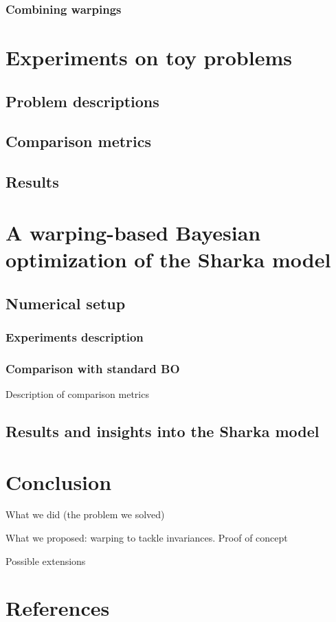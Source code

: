 \subsubsection{Combining warpings}

\section{Experiments on toy problems}

\subsection{Problem descriptions}

\subsection{Comparison metrics}

\subsection{Results}

\section{A warping-based Bayesian optimization of the Sharka model}

\subsection{Numerical setup}

\subsubsection{Experiments description}


\subsubsection{Comparison with standard BO}

Description of comparison metrics


\subsection{Results and insights into the Sharka model}

\section{Conclusion}

What we did (the problem we solved)

What we proposed: warping to tackle invariances. Proof of concept

Possible extensions

\section*{References}
